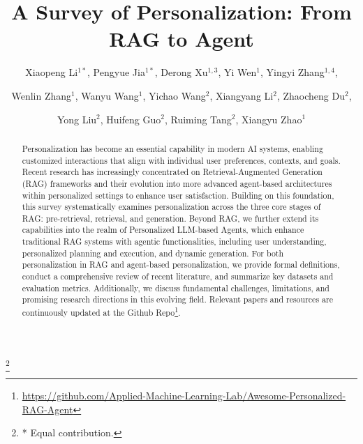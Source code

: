 \documentclass[sigconf]{acmart} %
\begin{document}
\title{A Survey of Personalization: From RAG to Agent}
\author{Xiaopeng Li$^{1*}$, Pengyue Jia$^{1*}$, Derong Xu$^{1,3}$, Yi Wen$^1$, Yingyi Zhang$^{1,4}$, }
\author{Wenlin Zhang$^1$, Wanyu Wang$^1$, Yichao Wang$^{2}$, Xiangyang Li$^{2}$, Zhaocheng Du$^{2}$,}
\author{Yong Liu$^2$, Huifeng Guo$^2$, Ruiming Tang$^2$, Xiangyu Zhao$^1$}
\thanks{* Equal contribution.}



\renewcommand{\shortauthors}{Xiaopeng Li and Pengyue Jia, et al.}

\begin{abstract}

Personalization has become an essential capability in modern AI systems, enabling customized interactions that align with individual user preferences, contexts, and goals. Recent research has increasingly concentrated on Retrieval-Augmented Generation (RAG) frameworks and their evolution into more advanced agent-based architectures within personalized settings to enhance user satisfaction. Building on this foundation, this survey systematically examines personalization across the three core stages of RAG: pre-retrieval, retrieval, and generation. Beyond RAG, we further extend its capabilities into the realm of Personalized LLM-based Agents, which enhance traditional RAG systems with agentic functionalities, including user understanding, personalized planning and execution, and dynamic generation. 
For both personalization in RAG and agent-based personalization, we provide formal definitions, conduct a comprehensive review of recent literature, and summarize key datasets and evaluation metrics. Additionally, we discuss fundamental challenges, limitations, and promising research directions in this evolving field. Relevant papers and resources are continuously updated at the Github Repo\footnote{\url{https://github.com/Applied-Machine-Learning-Lab/Awesome-Personalized-RAG-Agent}}.

\end{abstract}
\end{document}
